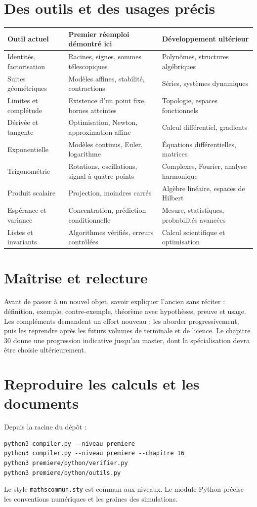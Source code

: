 \documentclass[11pt,a4paper,oneside]{book}
\begin{document}
\section{Des outils et des usages précis}
\begin{longtable}{>{\raggedright\arraybackslash}p{.25\linewidth}>{\raggedright\arraybackslash}p{.35\linewidth}>{\raggedright\arraybackslash}p{.30\linewidth}}
\toprule Outil actuel & Premier réemploi démontré ici & Développement ultérieur\\\midrule
Identités, factorisation & Racines, signes, sommes télescopiques & Polynômes, structures algébriques\\
Suites géométriques & Modèles affines, stabilité, contractions & Séries, systèmes dynamiques\\
Limites et complétude & Existence d'un point fixe, bornes atteintes & Topologie, espaces fonctionnels\\
Dérivée et tangente & Optimisation, Newton, approximation affine & Calcul différentiel, gradients\\
Exponentielle & Modèles continus, Euler, logarithme & Équations différentielles, matrices\\
Trigonométrie & Rotations, oscillations, signal à quatre points & Complexes, Fourier, analyse harmonique\\
Produit scalaire & Projection, moindres carrés & Algèbre linéaire, espaces de Hilbert\\
Espérance et variance & Concentration, prédiction conditionnelle & Mesure, statistiques, probabilités avancées\\
Listes et invariants & Algorithmes vérifiés, erreurs contrôlées & Calcul scientifique et optimisation\\\bottomrule
\end{longtable}

\section{Maîtrise et relecture}
Avant de passer à un nouvel objet, savoir expliquer l'ancien sans réciter :
définition, exemple, contre-exemple, théorème avec hypothèses, preuve et usage.
Les compléments demandent un effort nouveau ; les aborder progressivement,
puis les reprendre après les futurs volumes de terminale et de licence.
Le chapitre 30 donne une progression indicative jusqu'au master, dont la
spécialisation devra être choisie ultérieurement.

\section{Reproduire les calculs et les documents}
Depuis la racine du dépôt :
\begin{lstlisting}
python3 compiler.py --niveau premiere
python3 compiler.py --niveau premiere --chapitre 16
python3 premiere/python/verifier.py
python3 premiere/python/outils.py
\end{lstlisting}
Le style \texttt{mathscommun.sty} est commun aux niveaux. Le module Python précise
les conventions numériques et les graines des simulations.
\end{document}

